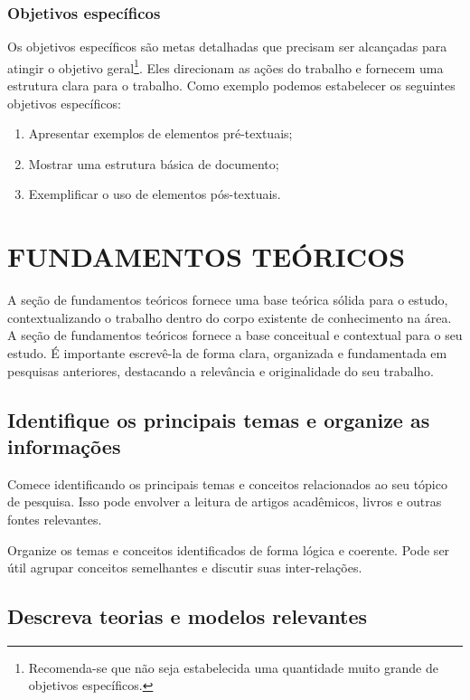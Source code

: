 \documentclass{iftex2024}
\begin{document}
\subsection{Objetivos específicos}

Os objetivos específicos são metas detalhadas que precisam ser alcançadas para atingir o objetivo geral\footnote{Recomenda-se que não seja estabelecida uma quantidade muito grande de objetivos específicos.}.
Eles direcionam as ações do trabalho e fornecem uma estrutura clara para o trabalho.
Como exemplo podemos estabelecer os seguintes objetivos específicos:
\begin{enumerate}
 \item Apresentar exemplos de elementos pré-textuais;
 \item Mostrar uma estrutura básica de documento;
 \item Exemplificar o uso de elementos pós-textuais.
\end{enumerate}

\chapter{FUNDAMENTOS TEÓRICOS}

A seção de fundamentos teóricos fornece uma base teórica sólida para o estudo, contextualizando o trabalho dentro do corpo existente de conhecimento na área.
A seção de fundamentos teóricos fornece a base conceitual e contextual para o seu estudo.
É importante escrevê-la de forma clara, organizada e fundamentada em pesquisas anteriores, destacando a relevância e originalidade do seu trabalho.

\section{Identifique os principais temas e organize as informações}

Comece identificando os principais temas e conceitos relacionados ao seu tópico de pesquisa.
Isso pode envolver a leitura de artigos acadêmicos, livros e outras fontes relevantes.

Organize os temas e conceitos identificados de forma lógica e coerente.
Pode ser útil agrupar conceitos semelhantes e discutir suas inter-relações.

\section{Descreva teorias e modelos relevantes}
\end{document}

